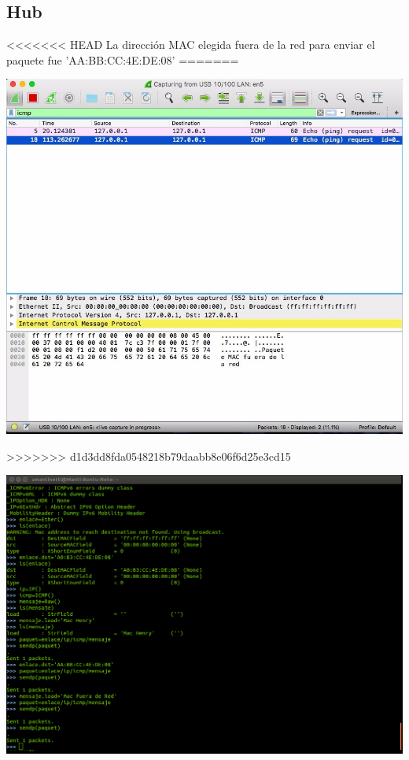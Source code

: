 \documentclass[spanish]{udpreport}
\begin{document}
\subsection{Hub}

<<<<<<< HEAD
La dirección MAC elegida fuera de la red para enviar el paquete fue 'AA:BB:CC:4E:DE:08'
=======
\begin{center}
	\includegraphics[scale=.37]{imagenes/Hub/Test_3_Wireshark_b.jpg}
\end{center}


>>>>>>> d1d3dd8fda0548218b79daabb8e06f6d25e3cd15

\begin{center}
	\includegraphics[scale=.27]{imagenes/Hub/consoleout.png}
\end{center}
\end{document}
